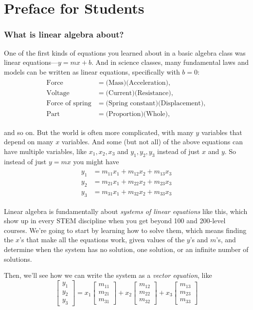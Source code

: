 \documentclass[11pt, letterpaper]{report}
\newcommand{\bbbvec}[3]{
  \begin{bmatrix} #1 \\ #2 \\ #3 \end{bmatrix}
}
\begin{document}
\section{Preface for Students}

\subsubsection{What is linear algebra about?}

One of the first kinds of equations you learned about in a basic algebra class was linear equations---${y=mx+b}$. And in science classes, many fundamental laws and models can be written as linear equations, specifically with ${b =0}$:
\begin{align*}
\begin{split}
\text{Force} &= \text{(Mass)}\text{(Acceleration)}, \\
\text{Voltage} &= \text{(Current)}\text{(Resistance)}, \\
\text{Force of spring} &= \text{(Spring constant)}\text{(Displacement)}, \\
\text{Part} &= \text{(Proportion)}\text{(Whole)},
\end{split}
\end{align*}

and so on. But the world is often more complicated, with many $y$ variables that depend on many $x$ variables. And some (but not all) of the above equations can have multiple variables, like $x_1, x_2, x_3$ and $y_1, y_2, y_3$ instead of just $x$ and $y$. So instead of just ${y=mx}$ you might have
\begin{align} \label{eq:basic system}
  \begin{split}
    y_1 &= m_{11}x_1+m_{12}x_2+m_{13}x_{3} \\
    y_2 &= m_{21}x_1+m_{22}x_2+m_{23}x_{3} \\
    y_3 &= m_{31}x_1+m_{32}x_2+m_{33}x_{3}
  \end{split}
\end{align}

Linear algebra is fundamentally about \emph{systems of linear equations} like this, which show up in every STEM discipline when you get beyond 100 and 200-level courses. We're going to start by learning how to solve them, which means finding the $x$'s that make all the equations work, given values of the $y$'s and $m$'s, and determine when the system has no solution, one solution, or an infinite number of solutions.

Then, we'll see how we can write the system as a \emph{vector equation}, like
\[ \bbbvec{y_1}{y_2}{y_3} = x_1\bbbvec{m_{11}}{m_{21}}{m_{31}} +
x_2\bbbvec{m_{12}}{m_{22}}{m_{32}} +
x_3\bbbvec{m_{13}}{m_{23}}{m_{33}}\]
\end{document}
